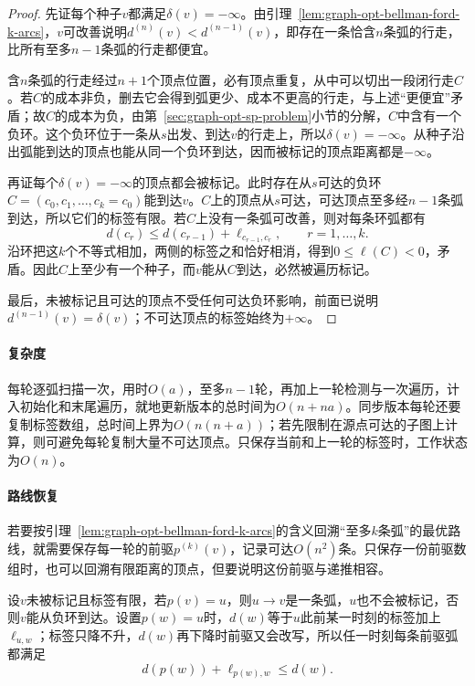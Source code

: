 \begin{proof}
先证每个种子$v$都满足$\delta(v)=-\infty$。由引理~\ref{lem:graph-opt-bellman-ford-k-arcs}，$v$可改善说明$d^{(n)}(v)<d^{(n-1)}(v)$，即存在一条恰含$n$条弧的行走，比所有至多$n-1$条弧的行走都便宜。

含$n$条弧的行走经过$n+1$个顶点位置，必有顶点重复，从中可以切出一段闭行走$C$。若$C$的成本非负，删去它会得到弧更少、成本不更高的行走，与上述“更便宜”矛盾；故$C$的成本为负，由第~\ref{sec:graph-opt-sp-problem}小节的分解，$C$中含有一个负环。这个负环位于一条从$s$出发、到达$v$的行走上，所以$\delta(v)=-\infty$。从种子沿出弧能到达的顶点也能从同一个负环到达，因而被标记的顶点距离都是$-\infty$。

再证每个$\delta(v)=-\infty$的顶点都会被标记。此时存在从$s$可达的负环$C=(c_0,c_1,\ldots,c_k=c_0)$能到达$v$。$C$上的顶点从$s$可达，可达顶点至多经$n-1$条弧到达，所以它们的标签有限。若$C$上没有一条弧可改善，则对每条环弧都有
\[
  d(c_{r})\leq d(c_{r-1})+\ell_{c_{r-1},c_r},\qquad r=1,\ldots,k.
\]
沿环把这$k$个不等式相加，两侧的标签之和恰好相消，得到$0\leq\ell(C)<0$，矛盾。因此$C$上至少有一个种子，而$v$能从$C$到达，必然被遍历标记。

最后，未被标记且可达的顶点不受任何可达负环影响，前面已说明$d^{(n-1)}(v)=\delta(v)$；不可达顶点的标签始终为$+\infty$。
\end{proof}

\paragraph{复杂度}
每轮逐弧扫描一次，用时$O(a)$，至多$n-1$轮，再加上一轮检测与一次遍历，计入初始化和末尾遍历，就地更新版本的总时间为$O(n+na)$。同步版本每轮还要复制标签数组，总时间上界为$O(n(n+a))$；若先限制在源点可达的子图上计算，则可避免每轮复制大量不可达顶点。只保存当前和上一轮的标签时，工作状态为$O(n)$。

\paragraph{路线恢复}
若要按引理~\ref{lem:graph-opt-bellman-ford-k-arcs}的含义回溯“至多$k$条弧”的最优路线，就需要保存每一轮的前驱$p^{(k)}(v)$，记录可达$O(n^2)$条。只保存一份前驱数组时，也可以回溯有限距离的顶点，但要说明这份前驱与递推相容。

设$v$未被标记且标签有限，若$p(v)=u$，则$u\to v$是一条弧，$u$也不会被标记，否则$v$能从负环到达。设置$p(w)=u$时，$d(w)$等于$u$此前某一时刻的标签加上$\ell_{u,w}$；标签只降不升，$d(w)$再下降时前驱又会改写，所以任一时刻每条前驱弧都满足
\[
  d(p(w))+\ell_{p(w),w}\leq d(w).
\]

